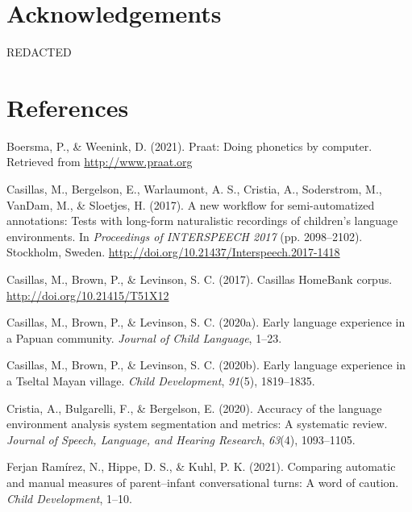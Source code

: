\documentclass[10pt, letterpaper]{article}
\begin{document}
\hypertarget{acknowledgements}{%
\section{Acknowledgements}\label{acknowledgements}}

REDACTED

\hypertarget{references}{%
\section{References}\label{references}}

\setlength{\parindent}{-0.1in} 
\setlength{\leftskip}{0.125in}

\noindent

\hypertarget{refs}{}
\leavevmode\hypertarget{ref-PRAAT}{}%
Boersma, P., \& Weenink, D. (2021). Praat: Doing phonetics by computer.
Retrieved from \url{http://www.praat.org}

\leavevmode\hypertarget{ref-casillas2017workflow}{}%
Casillas, M., Bergelson, E., Warlaumont, A. S., Cristia, A., Soderstrom,
M., VanDam, M., \& Sloetjes, H. (2017). A new workflow for
semi-automatized annotations: Tests with long-form naturalistic
recordings of children's language environments. In \emph{Proceedings of
INTERSPEECH 2017} (pp. 2098--2102). Stockholm, Sweden.
\url{http://doi.org/10.21437/Interspeech.2017-1418}

\leavevmode\hypertarget{ref-Casillas-HB}{}%
Casillas, M., Brown, P., \& Levinson, S. C. (2017). Casillas HomeBank
corpus. \url{http://doi.org/10.21415/T51X12}

\leavevmode\hypertarget{ref-casillas2020rossel}{}%
Casillas, M., Brown, P., \& Levinson, S. C. (2020a). Early language
experience in a Papuan community. \emph{Journal of Child Language},
1--23.

\leavevmode\hypertarget{ref-casillas2020tseltal}{}%
Casillas, M., Brown, P., \& Levinson, S. C. (2020b). Early language
experience in a Tseltal Mayan village. \emph{Child Development},
\emph{91}(5), 1819--1835.

\leavevmode\hypertarget{ref-cristia2020accuracy}{}%
Cristia, A., Bulgarelli, F., \& Bergelson, E. (2020). Accuracy of the
language environment analysis system segmentation and metrics: A
systematic review. \emph{Journal of Speech, Language, and Hearing
Research}, \emph{63}(4), 1093--1105.

\leavevmode\hypertarget{ref-ferjan2021comparing}{}%
Ferjan Ramírez, N., Hippe, D. S., \& Kuhl, P. K. (2021). Comparing
automatic and manual measures of parent--infant conversational turns: A
word of caution. \emph{Child Development}, 1--10.
\end{document}
